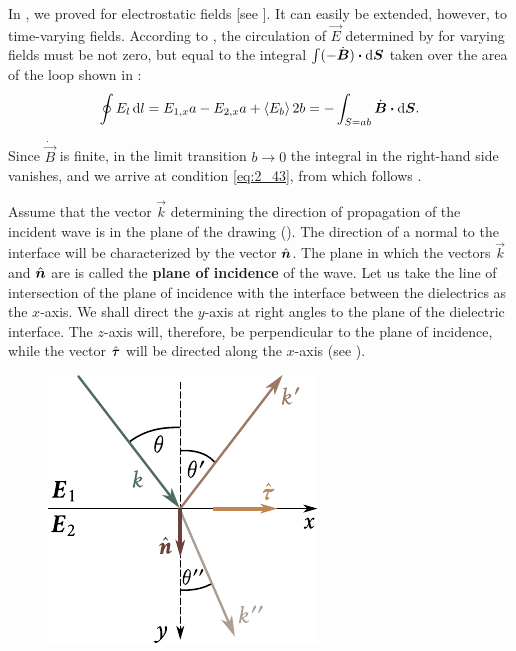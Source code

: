 In , we proved  for electrostatic fields [see ].
It can easily be extended, however, to time-varying fields.
According to , the circulation of $\vec{E}$ determined by  for varying fields must be not zero, but equal to the integral $\int(-\dot{\boldsymbol{B}})\boldsymbol{\cdot}\mathrm{d}\boldsymbol{S}$ taken over the area of the loop shown in :
\begin{equation*}
    \oint E_l\, \mathrm{d} l = E_{1,x}a - E_{2,x}a + \left\langle E_b \right\rangle 2b = - \int_{S=ab} \dot{\boldsymbol{B}} \boldsymbol{\cdot} \mathrm{d}\boldsymbol{S}.
\end{equation*}

\noindent
Since $\dot{\vec{B}}$ is finite, in the limit transition $b\to 0$ the integral in the right-hand side vanishes, and we arrive at condition \eqref{eq:2_43}, from which follows .

Assume that the vector $\vec{k}$ determining the direction of propagation of the incident wave is in the plane of the drawing ().
The direction of a normal to the interface will be characterized by the vector $\hat{\boldsymbol{n}}$.
The plane in which the vectors $\vec{k}$ and $\hat{\boldsymbol{n}}$ are is called the \textbf{plane of incidence} of the wave.
Let us take the line of intersection of the plane of incidence with the interface between the dielectrics
as the $x$-axis.
We shall direct the $y$-axis at right angles to the plane of the dielectric interface.
The $z$-axis will, therefore, be perpendicular to the plane of incidence, while the vector $\hat{\boldsymbol{\tau}}$ will be directed along the $x$-axis
(see ).

\begin{figure}[t]
	\begin{center}
		\includegraphics[scale=1]{figures/ch_16/fig_16_2.pdf}
		\caption[]{}
		\label{fig:16_2}
	\end{center}
	\vspace{-0.8cm}
\end{figure}

